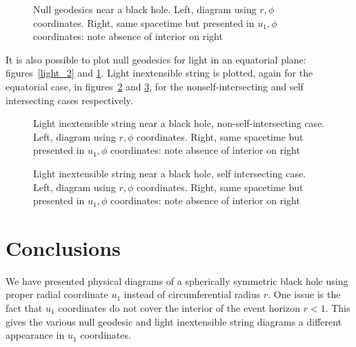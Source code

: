 \documentclass{article}
\begin{document}
\begin{figure}%
    \centering
    \caption{Null geodesics near a black hole.  Left, diagram using $r,\phi$
      coordinates.  Right, same spacetime but presented in $u_1,\phi$
      coordinates: note absence of interior on right}
    \label{light_closest_2}%
\end{figure}

It is also possible to plot null geodesics for light in an equatorial
plane: figures~\ref{light_2} and \ref{light_closest_2}.  Light
inextensible string is plotted, again for the equatorial case, in
figures~\ref{closest_approach_nonself} and
\ref{closest_approach_self}, for the nonself-intersecting and self
intersecting cases respectively.


\begin{figure}%
    \centering
    \caption{Light inextensible string near a black hole,
      non-self-intersecting case.  Left, diagram using $r,\phi$
      coordinates.  Right, same spacetime but presented in $u_1,\phi$
      coordinates: note absence of interior on right}
    \label{closest_approach_nonself}%
\end{figure}

\begin{figure}%
    \centering
    \caption{Light inextensible string near a black hole, self
      intersecting case.  Left, diagram using $r,\phi$ coordinates.
      Right, same spacetime but presented in $u_1,\phi$ coordinates:
      note absence of interior on right}
    \label{closest_approach_self}%
\end{figure}

\section{Conclusions}

We have presented physical diagrams of a spherically symmetric black
hole using proper radial coordinate $u_1$ instead of circumferential
radius $r$.  One issue is the fact that $u_1$ coordinates do not cover
the interior of the event horizon $r<1$.  This gives the various null
geodesic and light inextensible string diagrams a different appearance
in $u_1$ coordinates.



\end{document}
